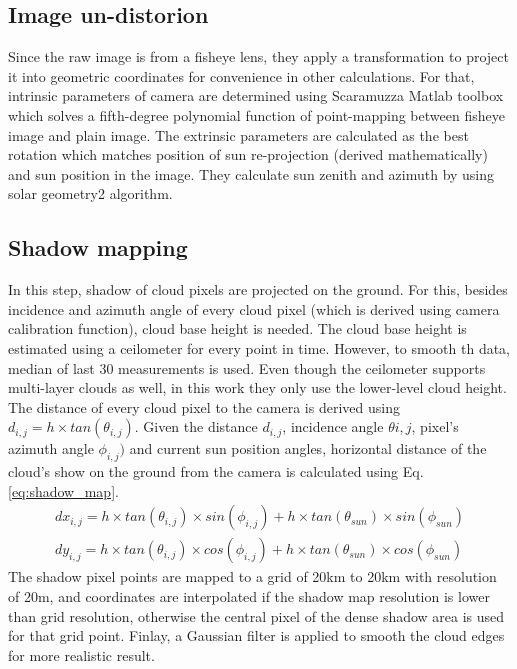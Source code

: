 \subsection{Image un-distorion}
\label{sec:image_undistortion_schmidt}
Since the raw image is from a fisheye lens, they apply a transformation to project it into geometric coordinates for convenience in other calculations. For that, intrinsic parameters of camera are determined using Scaramuzza Matlab toolbox \cite{fisheye_undistort} which solves a fifth-degree polynomial function of point-mapping between fisheye image and plain image. The extrinsic parameters are calculated as the best rotation which matches position of sun re-projection (derived mathematically) and sun position in the image. They calculate sun zenith and azimuth by using solar geometry2 algorithm\cite{sun_pos1}.

\subsection{Shadow mapping}
In this step, shadow of cloud pixels are projected on the ground. For this, besides incidence and azimuth angle of every cloud pixel (which is derived using camera calibration function), cloud base height is needed. The cloud base height is estimated using a ceilometer for every point in time. However, to smooth th data, median of last 30 measurements is used. Even though the ceilometer supports multi-layer clouds as well, in this work they only use the lower-level cloud height. The distance of every cloud pixel to the camera is derived using $d_{i,j} = h \times tan(\theta_{i,j})$. Given the distance $d_{i,j}$, incidence angle $\theta{i,j}$, pixel's azimuth angle $\phi_{i,j})$ and current sun position angles, horizontal distance of the cloud's show on the ground from the camera is calculated using Eq. \ref{eq:shadow_map}.
\begin{equation}
\label{eq:shadow_map}
\begin{split}
dx_{i,j} = h \times tan(\theta_{i,j}) \times sin(\phi_{i,j}) + h \times  tan(\theta_{sun}) \times sin(\phi_{sun}) \\
dy_{i,j} = h \times tan(\theta_{i,j}) \times cos(\phi_{i,j}) + h \times  tan(\theta_{sun}) \times cos(\phi_{sun})
\end{split}
\end{equation}
The shadow pixel points are mapped to a grid of 20km to 20km with resolution of 20m, and coordinates are interpolated if the shadow map resolution is lower than grid resolution, otherwise the central pixel of the dense shadow area is used for that grid point. Finlay, a Gaussian filter is applied to smooth the cloud edges for more realistic result.

